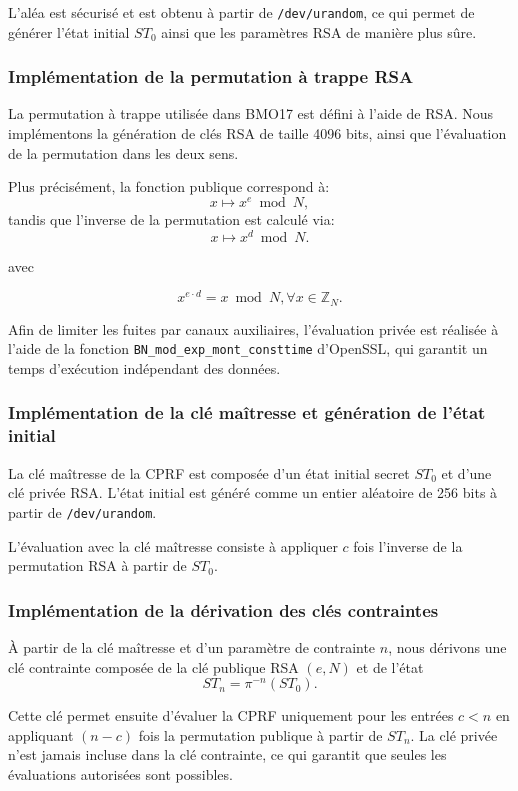 \documentclass[9pt]{extarticle}
\begin{document}
L’aléa est sécurisé et est obtenu à partir de \texttt{/dev/urandom}, ce qui
permet de générer l’état initial $ST_0$ ainsi que les paramètres RSA de manière plus sûre.


\subsubsection{Implémentation de la permutation à trappe RSA}

La permutation à trappe utilisée dans BMO17 est défini à l’aide de RSA.
Nous implémentons la génération de clés RSA de taille 4096 bits, ainsi que l’évaluation
de la permutation dans les deux sens.

Plus précisément, la fonction publique correspond à:
\[
x \mapsto x^e \bmod N,
\]
tandis que l’inverse de la permutation est calculé via:
\[
x \mapsto x^d \bmod N.
\]

avec 

\[
x^{e \cdot d} = x \bmod N , \forall x \in \mathbb{Z}_N.
\] 

Afin de limiter les fuites par canaux auxiliaires, l’évaluation privée est réalisée à l’aide
de la fonction \texttt{BN\_mod\_exp\_mont\_consttime} d’OpenSSL, qui garantit un temps
d’exécution indépendant des données.


\subsubsection{Implémentation de la clé maîtresse et génération de l’état initial}

La clé maîtresse de la CPRF est composée d’un état initial secret $ST_0$ et d’une clé
privée RSA. L’état initial est généré comme un entier aléatoire de 256 bits à partir de
\texttt{/dev/urandom}.

L’évaluation avec la clé maîtresse consiste à appliquer $c$ fois l’inverse de la permutation
RSA à partir de $ST_0$.

\subsubsection{Implémentation de la dérivation des clés contraintes}

À partir de la clé maîtresse et d’un paramètre de contrainte $n$, nous dérivons une clé
contrainte composée de la clé publique RSA $(e, N)$ et de l’état
\[
ST_n = \pi^{-n}(ST_0).
\]

Cette clé permet ensuite d’évaluer la CPRF uniquement pour les entrées $c < n$ en
appliquant $(n-c)$ fois la permutation publique à partir de $ST_n$. La clé privée n’est
jamais incluse dans la clé contrainte, ce qui garantit que seules les évaluations autorisées
sont possibles.
\end{document}
